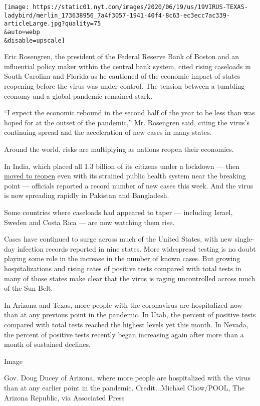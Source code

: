 \texttt{[image: https://static01.nyt.com/images/2020/06/19/us/19VIRUS-TEXAS-ladybird/merlin\_173638956\_7a4f3057-1941-40f4-8c63-ec3ecc7ac339-articleLarge.jpg?quality=75\\\&auto=webp\\\&disable=upscale]}

Eric Rosengren, the president of the Federal Reserve Bank of Boston and
an influential policy maker within the central bank system, cited rising
caseloads in South Carolina and Florida as he cautioned of the economic
impact of states reopening before the virus was under control. The
tension between a tumbling economy and a global pandemic remained stark.

``I expect the economic rebound in the second half of the year to be
less than was hoped for at the outset of the pandemic,'' Mr. Rosengren
said, citing the virus's continuing spread and the acceleration of new
cases in many states.

Around the world, risks are multiplying as nations reopen their
economies.

In India, which placed all 1.3 billion of its citizens under a lockdown
--- then
\href{https://www.nytimes.com/2020/06/10/world/asia/reopening-before-coronavirus-ends.html}{moved
to reopen} even with its strained public health system near the breaking
point --- officials reported a record number of new cases this week. And
the virus is now spreading rapidly in Pakistan and Bangladesh.

Some countries where caseloads had appeared to taper --- including
Israel, Sweden and Costa Rica --- are now watching them rise.

Cases have continued to surge across much of the United States, with new
single-day infection records reported in nine states. More widespread
testing is no doubt playing some role in the increase in the number of
known cases. But growing hospitalizations and rising rates of positive
tests compared with total tests in many of those states make clear that
the virus is raging uncontrolled across much of the Sun Belt.

In Arizona and Texas, more people with the coronavirus are hospitalized
now than at any previous point in the pandemic. In Utah, the percent of
positive tests compared with total tests reached the highest levels yet
this month. In Nevada, the percent of positive tests recently began
increasing again after more than a month of sustained declines.

Image

Gov. Doug Ducey of Arizona, where more people are hospitalized with the
virus than at any earlier point in the pandemic. Credit...Michael
Chow/POOL, The Arizona Republic, via Associated Press

